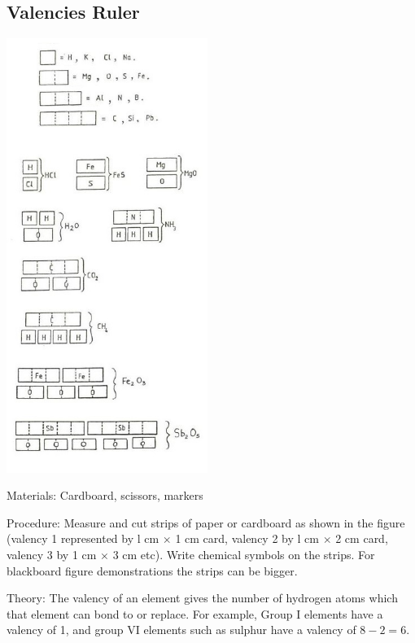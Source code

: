 \begin{multicols}{2}


\subsection{Valencies Ruler}

\begin{center}
\includegraphics[width=0.49\textwidth]{./img/source/valency-ruler.jpg}
\end{center}

\begin{description*}
\item[Materials:]{Cardboard, scissors, markers}
\item[Procedure:]{Measure and cut strips of paper or cardboard as shown in the figure (valency 1 represented by
l cm $\times$ 1 cm card, valency 2 by l cm $\times$ 2 cm card,
valency 3 by 1 cm $\times$ 3 cm etc). Write chemical
symbols on the strips. For blackboard figure
demonstrations the strips can be bigger.}
\item[Theory:]{The valency of an element gives the number of
hydrogen atoms which that element can bond to or
replace. For example, Group I elements have a valency of 1, and group VI elements such as sulphur have a valency of $8-2=6$.}
\end{description*}


\end{multicols}
